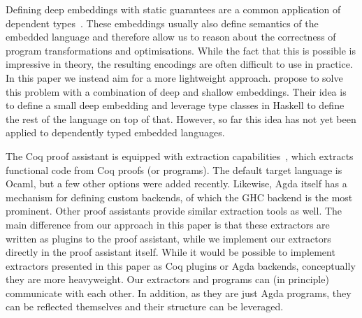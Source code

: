 \documentclass[sigplan,screen,anonymous,review]{acmart}
\begin{document}
Defining deep embeddings with static guarantees are a common application
of dependent types~\cite{10.5555/647849.737066,CHAPMAN200921,
10.1007/978-3-540-74464-1_7,10.1145/3236785,10.1145/1863495.1863497}.
%
These embeddings usually also define semantics of the embedded
language and therefore allow us to reason about the correctness
of program transformations and optimisations.
%
While the fact that this is possible is impressive in theory, the resulting
encodings are often difficult to use in practice. In this paper
we instead aim for a more lightweight approach.
%
\citet{deepshallow} propose to solve this problem with
a combination of deep and shallow embeddings.  Their idea is to define
a small deep embedding and leverage type classes in Haskell to define
the rest of the language on top of that.  However, so far this idea has not yet
been applied to dependently typed embedded languages.


The Coq proof assistant is equipped with extraction
capabilities~\cite{10.1007/978-3-540-69407-6_39,10.1007/3-540-39185-1_12},
which extracts functional code from Coq proofs (or programs).  The
default target language is Ocaml, but a few other options were added
recently.
%
Likewise, Agda itself has a mechanism for defining custom backends, of
which the GHC backend is the most prominent.
%
Other proof assistants provide similar extraction tools as well.
%
The main difference from our approach in this paper
is that these extractors are written as plugins to the proof
assistant, while we implement our extractors directly in the proof
assistant itself.
%
While it would be possible to implement extractors presented in this
paper as Coq plugins or Agda backends, conceptually they are more
heavyweight.  Our extractors and programs can (in principle)
communicate with each other. In addition, as they are just Agda programs, they can
be reflected themselves and their structure can be leveraged.
\end{document}
